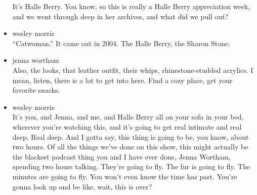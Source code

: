 \begin{itemize}
  It's Halle Berry. You know, so this is really a Halle Berry
  appreciation week, and we went through deep in her archives, and what
  did we pull out?
\item
  wesley morris\\
  ``Catwoman.'' It came out in 2004. The Halle Berry, the Sharon Stone.
\item
  jenna wortham\\
  Also, the looks, that leather outfit, their whips, rhinestone-studded
  acrylics. I mean, listen, there is a lot to get into here. Find a cozy
  place, get your favorite snacks.
\item
  wesley morris\\
  It's you, and Jenna, and me, and Halle Berry all on your sofa in your
  bed, wherever you're watching this, and it's going to get real
  intimate and real deep. Real deep. And I gotta say, this thing is
  going to be, you know, about two hours. Of all the things we've done
  on this show, this might actually be the blackest podcast thing you
  and I have ever done, Jenna Wortham, spending two hours talking.
  They're going to fly. The fur is going to fly. The minutes are going
  to fly. You won't even know the time has past. You're gonna look up
  and be like, wait, this is over?


\end{itemize}
